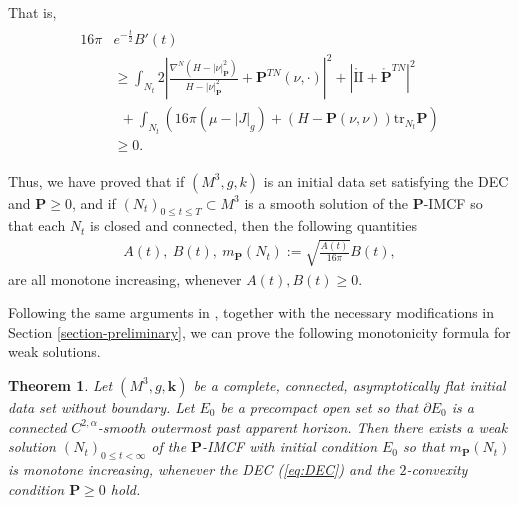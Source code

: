 \documentclass[11pt,letterpaper]{amsart}
\newtheorem{thm}{Theorem}[section]
\theoremstyle{definition}
\theoremstyle{remark}
\newcommand{\Pten}{\mathbf P}
\newcommand{\kten}{\mathbf k}
\begin{document}
That is,
\begin{align}\label{B'-ineq}
	\begin{split}
		16 \pi & e ^{-\frac{t}{2}}B'(t) \\
	&\geq  \int_{N_t} 2\left| \frac{\nabla ^{N} (H-|\nu |^2_{\Pten })}{H-|\nu |^2_{\Pten }} + \Pten ^{TN}(\nu , \cdot ) \right| ^2 + |\mathring{\mathrm{II}}+ \mathring{\Pten} ^{TN}|^2\\
	&\ \ + \int_{N_t}\left( 16 \pi (\mu -|J|_g)+ \left( H- \Pten(\nu ,\nu ) \right) \mathrm{tr}_{N_t} \Pten \right)   \\
	&\geq 0.
	\end{split}
\end{align} 

Thus, we have proved that if $(M^3,g ,k)$ is an initial data set satisfying the DEC and $\Pten \geq 0$, and if $(N_t)_{0 \leq t \leq T} \subset M^3$ is a smooth solution of the $\Pten$-IMCF so that each $N_t$ is closed and connected, then the following quantities 
\begin{align*}
	A(t),\ B(t),\ m_{\Pten}(N_t) := \sqrt{\frac{A(t)}{16 \pi }} B(t),
\end{align*} 
are all monotone increasing, whenever $A(t), B(t) \geq 0$.


Following the same arguments in \cite[Section 6]{Dong26SigmaIMCF}, together with the necessary modifications in Section \ref{section-preliminary}, we can prove the following monotonicity formula for weak solutions.

\begin{thm}\label{thm-weak-mono}
	Let $(M^3, g, \kten)$ be a complete, connected, asymptotically flat initial data set without boundary. Let $E_0$ be a precompact open set so that $\partial E_0$ is a connected $C ^{2, \alpha }$-smooth outermost past apparent horizon. Then there exists a weak solution $(N_t) _{0 \leq t< \infty}$ of the $\Pten$-IMCF with initial condition $E_0$ so that $m_{\Pten}(N_t)$ is monotone increasing, whenever the DEC (\ref{eq:DEC}) and the $2$-convexity condition $\mathbf{P} \geq 0$ hold.
\end{thm}
\end{document}
